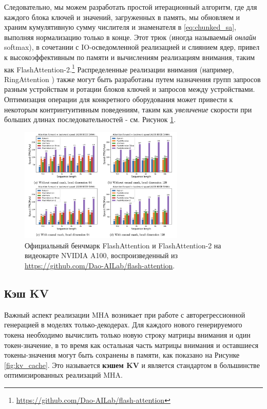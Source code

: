 Следовательно, мы можем разработать простой итерационный алгоритм, где для каждого блока ключей и значений, загруженных в память, мы обновляем и храним кумулятивную сумму числителя и знаменателя в \eqref{eq:chunked_sa}, выполняя нормализацию только в конце. Этот трюк (иногда называемый \textit{онлайн} softmax), в сочетании с IO-осведомленной реализацией и слиянием ядер, привел к высокоэффективным по памяти и вычислениям реализациям внимания, таким как FlashAttention-2.\footnote{\url{https://github.com/Dao-AILab/flash-attention}} Распределенные реализации внимания (например, RingAttention \cite{liu2023ring}) также могут быть разработаны путем назначения групп запросов разным устройствам и ротации блоков ключей и запросов между устройствами. Оптимизация операции для конкретного оборудования может привести к некоторым контринтуитивным поведениям, таким как \textit{увеличение} скорости при больших длинах последовательностей - см. Рисунок \ref{fig:flash_attention}.

\begin{figure}[t]
    \centering
    \includegraphics[width=0.7\textwidth]{images/flash2_a100_fwd_bwd_benchmark.png}
    \caption[Официальный бенчмарк FlashAttention и FlashAttention-2 на видеокарте NVIDIA A100.]{Официальный бенчмарк FlashAttention и FlashAttention-2 на видеокарте NVIDIA A100, воспроизведенный из \url{https://github.com/Dao-AILab/flash-attention}.}
    \label{fig:flash_attention}
\end{figure}

\subsection{Кэш KV}

Важный аспект реализации MHA возникает при работе с авторегрессионной генерацией в моделях только-декодерах. Для каждого нового генерируемого токена необходимо вычислить только новую строку матрицы внимания и один токен-значение, в то время как остальная часть матрицы внимания и оставшиеся токены-значения могут быть сохранены в памяти, как показано на Рисунке \ref{fig:kv_cache}. Это называется \textbf{кэшем KV} и является стандартом в большинстве оптимизированных реализаций MHA.

